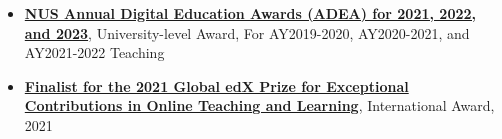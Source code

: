 \documentclass[10pt,a4paper]{article}
\begin{document}
\begin{small}
\begin{itemize}
  \item \textbf{\href{https://ctlt.nus.edu.sg/teaching-awards/award-winners/}{NUS Annual Digital Education Awards (ADEA) for 2021, 2022, and 2023}}, University-level Award, For AY2019-2020, AY2020-2021, and AY2021-2022 Teaching%



  \item \textbf{\href{https://press.edx.org/celebrating-the-2021-edx-prize-finalists}{Finalist for the 2021 Global edX Prize for Exceptional Contributions in Online Teaching and Learning}}, International Award, 2021%

\end{itemize}




\end{small}
\end{document}
